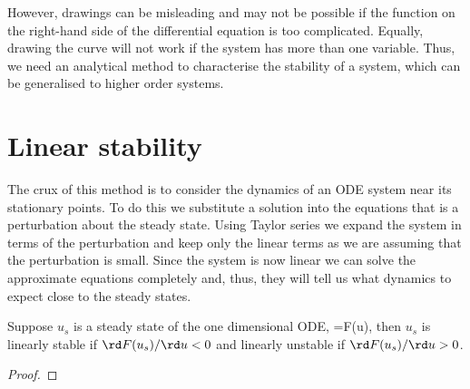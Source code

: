 However, drawings can be misleading and may not be possible if the function on the right-hand side of the differential equation is too complicated. Equally, drawing the curve will not work if the system has more than one variable. Thus, we need an analytical method to characterise the stability of a system, which can be generalised to higher order systems.

\section{Linear stability}
The crux of this method is to consider the dynamics of an ODE system near its stationary points. To do this we substitute a solution into the equations that is a perturbation about the steady state. Using Taylor series we expand the system in terms of the perturbation and keep only the linear terms as we are assuming that the perturbation is small. Since the system is now linear we can solve the approximate equations completely and, thus, they will tell us what dynamics to expect close to the steady states.
\begin{thm}\label{Stability_theorem}
Suppose $u_s$ is a steady state of the one dimensional ODE,
\bb
{}=F(u),\label{General_ODE}
\ee
then $u_s$ is linearly stable if $\rd F(u_s)/\rd u<0$ and linearly unstable if $\rd F(u_s)/\rd u>0$.
\end{thm}
\begin{proof}
\end{proof}
